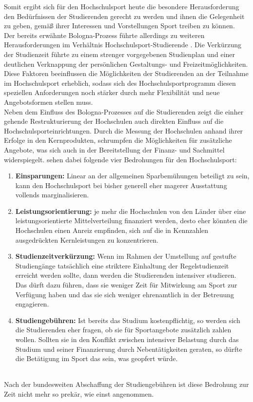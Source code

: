 Somit ergibt sich für den Hochschulsport heute die besondere Herausforderung den Bedürfnissen der Studierenden gerecht zu werden und ihnen die Gelegenheit zu geben, gemäß ihrer Interessen und Vorstellungen Sport treiben zu können. \\
Der bereits erwähnte Bologna-Prozess führte allerdings zu weiteren Herausforderungen im Verhältnis Hochschulsport-Studierende \cite[vgl. ][S.7]{Berthold.2007}. Die Verkürzung der Studienzeit führte zu einem strenger vorgegebenen Studienplan und einer deutlichen Verknappung der persönlichen Gestaltungs- und Freizeitmöglichkeiten. Diese Faktoren beeinflussen die Möglichkeiten der Studierenden an der Teilnahme im Hochschulsport erheblich, sodass sich des Hochschulsportprogramm diesen speziellen Anforderungen noch stärker durch mehr Flexibilität und neue Angebotsformen stellen muss.
\\
Neben dem Einfluss des Bologna-Prozesses auf die Studierenden zeigt die einher gehende Restrukturierung der Hochschulen auch direkten Einfluss auf die Hochschulsporteinrichtungen. Durch die Messung der Hochschulen anhand ihrer Erfolge in den Kernprodukten, schrumpfen die Möglichkeiten für zusätzliche Angebote, was sich auch in der Bereitstellung der Finanz- und Sachmittel widerspiegelt. \citeauthor{Berthold.2007} sehen dabei folgende vier Bedrohungen für den Hochschulsport:
\begin{enumerate}
\item \textbf{Einsparungen:} Linear an der allgemeinen Sparbemühungen beteiligt zu sein, kann den Hochschulsport bei bisher generell eher magerer Ausstattung vollends marginalisieren.
\item \textbf{Leistungsorientierung:} je mehr die Hochschulen von den Länder über eine leistungsorientierte Mittelverteilung finanziert werden, desto eher könnten die Hochschulen einen Anreiz empfinden, sich auf die in Kennzahlen ausgedrückten Kernleistungen zu konzentrieren.
\item \textbf{Studienzeitverkürzung:} Wenn im Rahmen der Umstellung auf gestufte Studiengänge tatsächlich eine striktere Einhaltung der Regelstudienzeit erreicht werden sollte, dann werden die Studierenden intensiver studieren. Das dürft dazu führen, dass sie weniger Zeit für Mitwirkung am Sport zur Verfügung haben und das sie sich weniger ehrenamtlich in der Betreuung engagieren.
\item \textbf{Studiengebühren:} Ist bereits das Studium kostenpflichtig, so werden sich die Studierenden eher fragen, ob sie für Sportangebote zusätzlich zahlen wollen. Sollten sie in den Konflikt zwischen intensiver Belastung durch das Studium und seiner Finanzierung durch Nebentätigkeiten geraten, so dürfte die Betätigung im Sport das sein, was geopfert würde.
\end{enumerate}
\cite[siehe ][S.16]{Berthold.2007}
\\
Nach der bundesweiten Abschaffung der Studiengebühren ist diese Bedrohung zur Zeit nicht mehr so prekär, wie einst angenommen.

